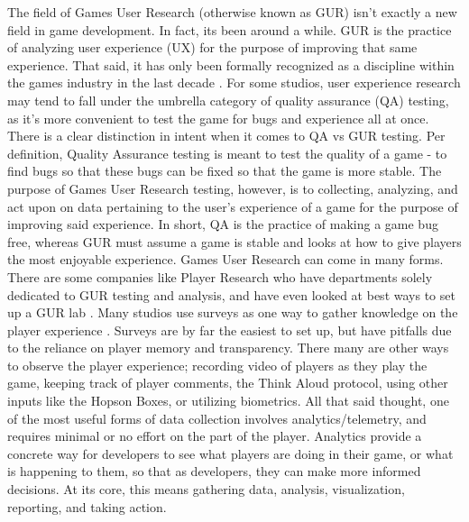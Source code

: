 \documentclass[journal]{IEEEtran}
\begin{document}
The field of Games User Research (otherwise known as GUR) isn’t exactly a new field in game development. In fact, its been around a while. GUR is the practice of analyzing user experience (UX) for the purpose of improving that same experience. That said, it has only been formally recognized as a discipline within the games industry in the last decade \cite{mirza-ch2}. For some studios, user experience research may tend to fall under the umbrella category of quality assurance (QA) testing, as it’s more convenient to test the game for bugs and experience all at once. There is a clear distinction in intent when it comes to QA vs GUR testing. Per definition, Quality Assurance testing is meant to test the quality of a game - to find bugs so that these bugs can be fixed so that the game is more stable. The purpose of Games User Research testing, however, is to collecting, analyzing, and act upon on data pertaining to the user’s experience of a game for the purpose of improving said experience. In short, QA is the practice of making a game bug free, whereas GUR must assume a game is stable and looks at how to give players the most enjoyable experience.
Games User Research can come in many forms. There are some companies like Player Research who have departments solely dedicated to GUR testing and analysis, and have even looked at best ways to set up a GUR lab \cite{mirza-ch6}. Many studios use surveys as one way to gather knowledge on the player experience \cite{mirza-ch9}. Surveys are by far the easiest to set up, but have pitfalls due to the reliance on player memory and transparency. There many are other ways to observe the player experience; recording video of players as they play the game, keeping track of player comments, the Think Aloud protocol, using other inputs like the Hopson Boxes, or utilizing biometrics. \cite{mirza-ch11} \cite{mirza-ch12} \cite{mirza-ch16} All that said thought, one of the most useful forms of data collection involves analytics/telemetry, and requires minimal or no effort on the part of the player. \cite{mirza-ch19} Analytics provide a concrete way for developers to see what players are doing in their game, or what is happening to them, so that as developers, they can make more informed decisions. At its core, this means gathering data, analysis, visualization, reporting, and taking action. \cite{mirza-ch19}
\end{document}
